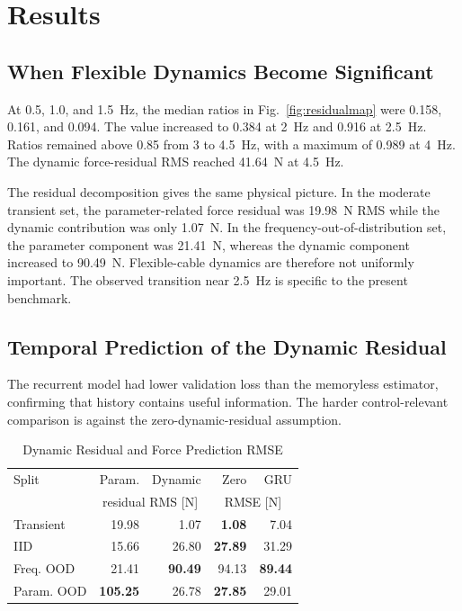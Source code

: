 \documentclass[conference]{IEEEtran}
\begin{document}
\section{Results}
\subsection{When Flexible Dynamics Become Significant}
At 0.5, 1.0, and \SI{1.5}{Hz}, the median ratios in Fig.~\ref{fig:residualmap} were 0.158, 0.161, and 0.094. The value increased to 0.384 at \SI{2}{Hz} and 0.916 at \SI{2.5}{Hz}. Ratios remained above 0.85 from 3 to \SI{4.5}{Hz}, with a maximum of 0.989 at \SI{4}{Hz}. The dynamic force-residual RMS reached \SI{41.64}{N} at \SI{4.5}{Hz}.

The residual decomposition gives the same physical picture. In the moderate transient set, the parameter-related force residual was \SI{19.98}{N} RMS while the dynamic contribution was only \SI{1.07}{N}. In the frequency-out-of-distribution set, the parameter component was \SI{21.41}{N}, whereas the dynamic component increased to \SI{90.49}{N}. Flexible-cable dynamics are therefore not uniformly important. The observed transition near \SI{2.5}{Hz} is specific to the present benchmark.

\subsection{Temporal Prediction of the Dynamic Residual}
The recurrent model had lower validation loss than the memoryless estimator, confirming that history contains useful information. The harder control-relevant comparison is against the zero-dynamic-residual assumption.

\begin{table}[t]
\caption{Dynamic Residual and Force Prediction RMSE}
\centering\footnotesize
\begin{tabular}{lrrrr}
\toprule
Split & Param. & Dynamic & Zero & GRU\\
 & \multicolumn{2}{c}{residual RMS [N]} & \multicolumn{2}{c}{RMSE [N]}\\
\midrule
Transient & 19.98 & 1.07 & \textbf{1.08} & 7.04\\
IID & 15.66 & 26.80 & \textbf{27.89} & 31.29\\
Freq. OOD & 21.41 & \textbf{90.49} & 94.13 & \textbf{89.44}\\
Param. OOD & \textbf{105.25} & 26.78 & \textbf{27.85} & 29.01\\
\bottomrule
\end{tabular}
\end{table}
\end{document}

